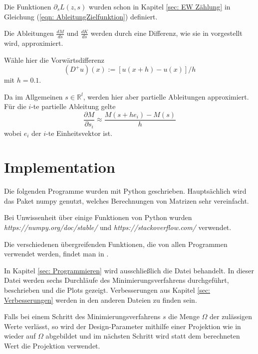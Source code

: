 \documentclass[a4paper,12pt]{report}
\newcommand{\R}{\mathbb R}
\newcommand{\zitat}[1]{\glqq #1\grqq}
\newcommand{\1}{\mathds{1}}
\theoremstyle{plain} %
\theoremstyle{definition} %
\theoremstyle{remark}
\begin{document}
            Die Funktionen $\partial_s L(z, s)$ wurden schon in Kapitel \ref{sec: EW Zählung} in Gleichung (\ref{eqn: AbleitungZielfunktion}) definiert.

            Die Ableitungen $\frac{d M}{d s}$ und $\frac{d K}{d s}$ werden durch eine Differenz, wie sie in \cite[S. 16 f.]{numerikGrossmann} vorgestellt wird, approximiert.

            Wähle hier die Vorwärtsdifferenz
            \begin{equation}
                  \label{def: DiffVerfahren}
                  (D^+u)(x):=[u(x+h)-u(x)]/h
            \end{equation}
            mit $h=0.1$.

            Da im Allgemeinen $s\in \R^l$, werden hier aber partielle Ableitungen approximiert.
            Für die $i$-te partielle Ableitung gelte
            $$\frac{\partial M}{\partial s_i}\approx \frac{M(s+h e_i)-M(s)}{h}$$
            wobei $e_i$ der $i$-te Einheitsvektor ist.
 
      \section{Implementation}
            Die folgenden Programme wurden mit Python geschrieben. Hauptsächlich wird das Paket \zitat{numpy} genutzt, welches Berechnungen von Matrizen sehr vereinfacht.

            Bei Unwissenheit über einige Funktionen von Python wurden\linebreak
            \textit{https://numpy.org/doc/stable/} und \textit{https://stackoverflow.com/} verwendet.

            Die verschiedenen übergreifenden Funktionen, die von allen Programmen verwendet werden, findet man in \mbox{\cite[\textit{./Funktionen.py}]{github}}.

            In Kapitel \ref{sec: Programmieren} wird ausschließlich die Datei \mbox{\cite[\textit{./erste Implementierung.py}]{github}} behandelt.
            In dieser Datei werden sechs Durchläufe des Minimierungsverfahrens durchgeführt, beschrieben und die Plots gezeigt.
            Verbesserungen aus Kapitel \ref{sec: Verbesserungen} werden in den anderen Dateien zu finden sein.
            
            Falls bei einem Schritt des Minimierungsverfahrens $s$ die Menge $\Omega$ der zulässigen Werte verlässt,
            so wird der Design-Parameter mithilfe einer Projektion wie in \cite[S. 314]{optimierungJarreProjektion} wieder auf $\Omega$ abgebildet
            und im nächsten Schritt wird statt dem berechneten Wert die Projektion verwendet.
            
\end{document}
